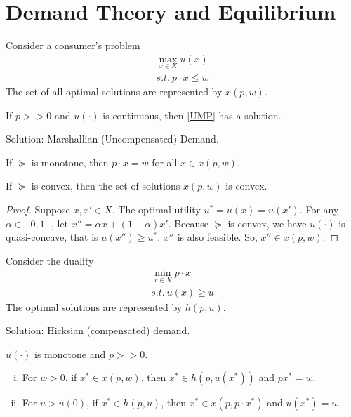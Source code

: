 \documentclass[11pt]{elegantbook}
\begin{document}
\section{Demand Theory and Equilibrium}
Consider a consumer's problem
\begin{equation}
    \begin{aligned}
        \max_{x\in X} u(x)\\
        s.t.\ p\cdot x\leq w
    \end{aligned}
    \tag{UMP}
    \label{UMP}
\end{equation}
The set of all optimal solutions are represented by $x(p,w)$.

\begin{proposition}
    If $p>>0$ and $u(\cdot)$ is continuous, then \ref{UMP} has a solution.
\end{proposition}
Solution: Marshallian (Uncompensated) Demand.

\begin{proposition}
    If $\succeq$ is monotone, then $p\cdot x=w$ for all $x\in x(p,w)$.
\end{proposition}

\begin{proposition}
    If $\succeq$ is convex, then the set of solutions $x(p,w)$ is convex.
\end{proposition}
\begin{proof}
    Suppose $x,x'\in X$. The optimal utility $u^*=u(x)=u(x')$. For any $\alpha\in[0,1]$, let $x''=\alpha x+(1-\alpha)x'$. Because $\succeq$ is convex, we have $u(\cdot)$ is quasi-concave, that is $u(x'')\geq u^*$. $x''$ is also feasible. So, $x''\in x(p,w)$.
\end{proof}

Consider the duality
\begin{equation}
    \begin{aligned}
        \min_{x\in X} p\cdot x\\
        s.t.\ u(x)\geq u
    \end{aligned}
    \tag{EMP}
    \label{EMP}
\end{equation}
The optimal solutions are represented by $h(p,u)$.

Solution: Hicksian (compensated) demand.

\begin{proposition}
    $u(\cdot)$ is monotone and $p>>0$.
    \begin{enumerate}[(i).]
        \item For $w>0$, if $x^*\in x(p,w)$, then $x^*\in h(p,u(x^*))$ and $px^*=w$.
        \item For $u>u(0)$, if $x^*\in h(p,u)$, then $x^*\in x(p,p\cdot x^*)$ and $u(x^*)=u$.
    \end{enumerate}
\end{proposition}
\end{document}
